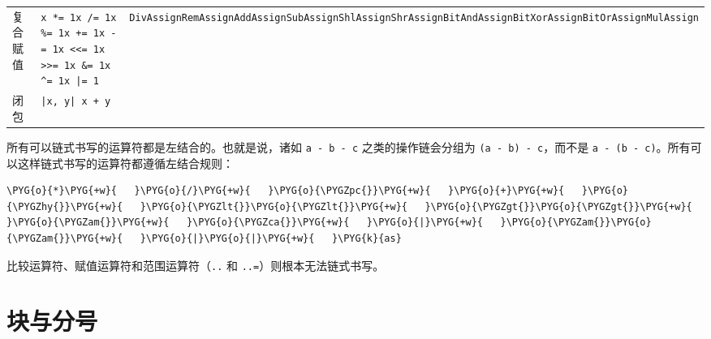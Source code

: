 \begin{xltabular}{\textwidth}{@{}>{\hsize\raggedright\arraybackslash}X>{\hsize\raggedright\arraybackslash}X>{\hsize\raggedright\arraybackslash}X@{}}
复合赋值 & \texttt{x *= 1}\newline{}\texttt{x /= 1}\newline{}\texttt{x \%= 1}\newline{}\texttt{x += 1}\newline{}\texttt{x -= 1}\newline{}\texttt{x <<= 1}\newline{}\texttt{x >>= 1}\newline{}\texttt{x \&= 1}\newline{}\texttt{x \textasciicircum{}= 1}\newline{}\texttt{x |= 1} & \texttt{DivAssign}\newline{}\texttt{RemAssign}\newline{}\texttt{AddAssign}\newline{}\texttt{SubAssign}\newline{}\texttt{ShlAssign}\newline{}\texttt{ShrAssign}\newline{}\texttt{BitAndAssign}\newline{}\texttt{BitXorAssign}\newline{}\texttt{BitOrAssign}\newline{}\texttt{MulAssign} \\
闭包 & \texttt{|x, y| x + y} &  \\
\end{xltabular}
\myTableEnd

所有可以链式书写的运算符都是左结合的。也就是说，诸如 \texttt{a - b - c} 之类的操作链会分组为 \texttt{(a - b) - c}，而不是 \texttt{a - (b - c)}。所有可以这样链式书写的运算符都遵循左结合规则：

\begin{Verbatim}[commandchars=\\\{\},breaklines=true,breakanywhere=true,fontsize=\codefont,xleftmargin=17bp]
\PYG{o}{*}\PYG{+w}{   }\PYG{o}{/}\PYG{+w}{   }\PYG{o}{\PYGZpc{}}\PYG{+w}{   }\PYG{o}{+}\PYG{+w}{   }\PYG{o}{\PYGZhy{}}\PYG{+w}{   }\PYG{o}{\PYGZlt{}}\PYG{o}{\PYGZlt{}}\PYG{+w}{   }\PYG{o}{\PYGZgt{}}\PYG{o}{\PYGZgt{}}\PYG{+w}{   }\PYG{o}{\PYGZam{}}\PYG{+w}{   }\PYG{o}{\PYGZca{}}\PYG{+w}{   }\PYG{o}{|}\PYG{+w}{   }\PYG{o}{\PYGZam{}}\PYG{o}{\PYGZam{}}\PYG{+w}{   }\PYG{o}{|}\PYG{o}{|}\PYG{+w}{   }\PYG{k}{as}
\end{Verbatim}

比较运算符、赋值运算符和范围运算符（\texttt{..} 和 \texttt{..=}）则根本无法链式书写。

\section{块与分号}

